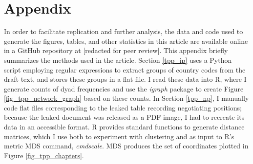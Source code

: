 \documentclass[12pt]{article}
\begin{document}

\section{Appendix}

In order to facilitate replication and further analysis, the data and code used to 
generate the figures, tables, and other statistics in this article are available online 
in a GitHub repository at [redacted for peer review]. This appendix briefly summarizes the methods used in the 
article. Section \ref{tpp_ip} uses a Python script employing regular expressions to extract groups of country 
codes from the draft text, and stores these groups in a flat file. I read these data 
into R, where I generate counts of dyad frequencies and use the \emph{igraph} package to 
create Figure \ref{fig_tpp_network_graph} based on these counts.
In Section \ref{tpp_np}, I manually code flat files corresponding 
to the leaked table recording negotiating positions; because the leaked document was released as a PDF image, 
I had to recreate its data in an accessible format. R provides standard functions to generate distance matrices, 
which I use both to experiment with clustering and as input to R's metric MDS 
command, \emph{cmdscale}. MDS produces the set of coordinates plotted in Figure \ref{fig_tpp_chapters}.

\theendnotes



\end{document}
